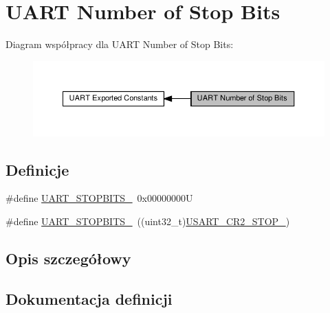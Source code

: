 \hypertarget{group___u_a_r_t___stop___bits}{}\section{U\+A\+RT Number of Stop Bits}
\label{group___u_a_r_t___stop___bits}
Diagram współpracy dla U\+A\+RT Number of Stop Bits\+:\nopagebreak
\begin{figure}[H]
\begin{center}
\leavevmode
\includegraphics[width=350pt]{group___u_a_r_t___stop___bits}
\end{center}
\end{figure}
\subsection*{Definicje}
\begin{DoxyCompactItemize}
\item 
\#define \hyperlink{group___u_a_r_t___stop___bits_ga7cf97e555292d574de8abc596ba0e2ce}{U\+A\+R\+T\+\_\+\+S\+T\+O\+P\+B\+I\+T\+S\+\_}~0x00000000U
\item 
\#define \hyperlink{group___u_a_r_t___stop___bits_ga91616523380f7450aac6cb7e17f0c0f2}{U\+A\+R\+T\+\_\+\+S\+T\+O\+P\+B\+I\+T\+S\+\_}~((uint32\+\_\+t)\hyperlink{group___peripheral___registers___bits___definition_ga2b24d14f0e5d1c76c878b08aad44d02b}{U\+S\+A\+R\+T\+\_\+\+C\+R2\+\_\+\+S\+T\+O\+P\+\_})
\end{DoxyCompactItemize}


\subsection{Opis szczegółowy}


\subsection{Dokumentacja definicji}
\mbox{\label{group___u_a_r_t___stop___bits_ga7cf97e555292d574de8abc596ba0e2ce}} 
